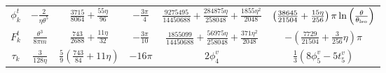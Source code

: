 \begin {table}[h]
\begin {center}
\begin {tabular}{cccccc}
$\phi^t_k$
      & $-\frac{2}{\eta \theta^5}$
      & $\frac{3715}{8064}+\frac{55\eta}{96}$
      & $-\frac{3\pi}{4}$ 
      & $\frac{9275495}{14450688}+\frac{284875\eta}{258048 } + 
\frac{1855\eta^2}{2048 }$
      & $\left (\frac {38645}{21504} + \frac{15\eta}{256 } \right ) \pi 
\ln \left ( \frac {\theta}{\theta_{\rm lso}} \right ) $\\[3pt]
$F^t_k$
      & $\frac{\theta^3}{8\pi m}$
      & $\frac{743}{2688}+\frac{11\eta}{32}$ 
      & $-\frac{3\pi}{10}$
       & $\frac {1855099}{14450688} + \frac{56975\eta}{258048 } + 
\frac{371\eta^2}{2048 }$ 
      & $- \left(\frac{7729}{21504} + \frac{3}{256}\eta\right)\pi$\\[3pt]
$\tau_k$ 
      & $\frac{3}{128\eta}$
      & $ \frac{5}{9} 
        \left ( \frac{743}{84} + 11\eta\right )$
      & $-16\pi $
      & $2  \phi^v_4$
      & $ \frac{1}{3} \left ( 8 \phi^v_5 - 5 t^v_5 \right ) $\\
      \hline
\end {tabular}
\end {center}
\label{table:flux}
\end {table}

